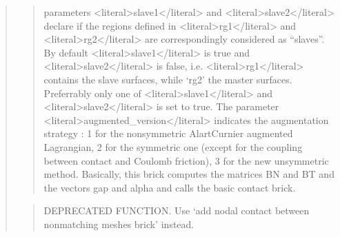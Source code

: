 \documentclass[a4paper,11pt,english]{sphinxmanual}
\begin{document}
\begin{quote}
\begin{quote}
parameters \textless{}literal\textgreater{}slave1\textless{}/literal\textgreater{} and \textless{}literal\textgreater{}slave2\textless{}/literal\textgreater{} declare if the regions defined in \textless{}literal\textgreater{}rg1\textless{}/literal\textgreater{}
and \textless{}literal\textgreater{}rg2\textless{}/literal\textgreater{} are correspondingly considered as “slaves”. By default
\textless{}literal\textgreater{}slave1\textless{}/literal\textgreater{} is true and \textless{}literal\textgreater{}slave2\textless{}/literal\textgreater{} is false, i.e. \textless{}literal\textgreater{}rg1\textless{}/literal\textgreater{} contains the slave
surfaces, while ‘rg2’ the master surfaces. Preferrably only one of
\textless{}literal\textgreater{}slave1\textless{}/literal\textgreater{} and \textless{}literal\textgreater{}slave2\textless{}/literal\textgreater{} is set to true.  The parameter \textless{}literal\textgreater{}augmented\_version\textless{}/literal\textgreater{}
indicates the augmentation strategy : 1 for the non\sphinxhyphen{}symmetric
Alart\sphinxhyphen{}Curnier augmented Lagrangian, 2 for the symmetric one (except for
the coupling between contact and Coulomb friction),
3 for the new unsymmetric method.
Basically, this brick computes the matrices BN and BT and the vectors
gap and alpha and calls the basic contact brick.
\end{quote}

\sphinxAtStartPar
{}
\begin{quote}

\sphinxAtStartPar
DEPRECATED FUNCTION. Use ‘add nodal contact between nonmatching meshes brick’ instead.
\end{quote}

\sphinxAtStartPar
{}
\begin{quote}


\end{quote}
\end{quote}
\end{document}
